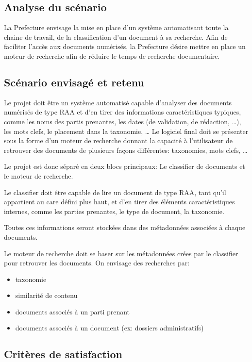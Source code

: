 
\subsection{Analyse du scénario}
La Prefecture envisage la mise en place d'un système automatisant toute la chaine de travail, de la classification d'un document à sa recherche.
Afin de faciliter l'accès aux documents numérisés, la Prefecture désire mettre en place un moteur de recherche afin de réduire le temps de recherche documentaire.



\subsection{Scénario envisagé et retenu}
Le projet doit être un système automatisé capable d'analyser des documents numérisés de type RAA et d'en tirer des informations caractéristiques typiques, comme les noms des partis prenantes,  les dates (de validation, de rédaction, \ldots), les mots clefs, le placement dans la taxonomie, \ldots 
Le logiciel final doit se présenter sous la forme d'un moteur de recherche donnant la capacité à l'utilisateur de retrouver des documents de plusieurs façons différentes: taxonomies, mots clefs, \ldots 

\par
Le projet est donc séparé en deux blocs principaux:
Le classifier de documents et le moteur de recherche.

Le classifier doit être capable de lire un document de type RAA, tant qu'il appartient au care défini plus haut, et d'en tirer des éléments caractéristiques internes, comme les parties prenantes, le type de document, la taxonomie.

Toutes ces informations seront stockées dans des métadonnées associées à chaque documents.


Le moteur de recherche doit se baser sur les métadonnées crées par le classifier pour retrouver les documents.
On envisage des recherches par:
\begin{itemize}
\item taxonomie
\item similarité de contenu
\item documents associés à un parti prenant 
\item documents associés à un document (ex: dossiers administratifs)
\end{itemize}



\subsection{Critères de satisfaction}

